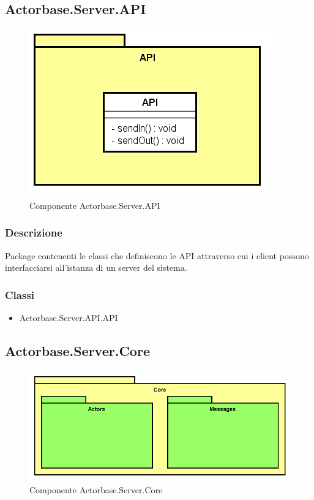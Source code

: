 \documentclass[a4paper]{article}
\begin{document}
		\subsection{Actorbase.Server.API}
			\begin{figure} [H]
			\centering
			\includegraphics[scale=0.70]{Server/Package/APILevel.png}
			\caption{Componente Actorbase.Server.API}
			\end{figure}
			\subsubsection{Descrizione}
				Package contenenti le classi che definiscono le API attraverso cui i client possono interfacciarsi all'istanza di un server del sistema.
			\subsubsection{Classi}
			\begin{itemize}
				\item Actorbase.Server.API.API
			\end{itemize}
			
		\subsection{Actorbase.Server.Core}
			\begin{figure} [H]
			\centering
			\includegraphics[scale=0.55]{Server/Package/CoreLevel.png}
			\caption{Componente Actorbase.Server.Core}
			\end{figure}
\end{document}
